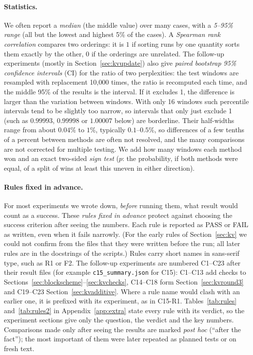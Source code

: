 \documentclass[10pt]{article}
\theoremstyle{plain}
\theoremstyle{definition}
\theoremstyle{remark}
\newcommand{\rl}[1]{\textsf{#1}}%
\begin{document}
\paragraph{Statistics.}
We often report a \emph{median} (the middle value) over many cases, with a \emph{5--95\% range} (all but the lowest and highest 5\% of the cases). A \emph{Spearman rank correlation} compares two orderings: it is $1$ if sorting runs by one quantity sorts them exactly by the other, $0$ if the orderings are unrelated. The follow-up experiments (mostly in Section~\ref{sec:kvupdate}) also give \emph{paired bootstrap 95\% confidence intervals} (CI) for the ratio of two perplexities: the test windows are resampled with replacement 10{,}000 times, the ratio is recomputed each time, and the middle 95\% of the results is the interval. If it excludes 1, the difference is larger than the variation between windows. With only 16 windows such percentile intervals tend to be slightly too narrow, so intervals that only just exclude 1 (such as $0.99993$, $0.99998$ or $1.00007$ below) are borderline. Their half-widths range from about $0.04\%$ to $1\%$, typically $0.1$--$0.5\%$, so differences of a few tenths of a percent between methods are often not resolved, and the many comparisons are not corrected for multiple testing. We add how many windows each method won and an exact two-sided \emph{sign test} ($p$: the probability, if both methods were equal, of a split of wins at least this uneven in either direction).

\paragraph{Rules fixed in advance.}
For most experiments we wrote down, \emph{before} running them, what result would count as a success. These \emph{rules fixed in advance} protect against choosing the success criterion after seeing the numbers. Each rule is reported as PASS or FAIL as written, even when it fails narrowly. (For the early rules of Section~\ref{sec:kv} we could not confirm from the files that they were written before the run; all later rules are in the docstrings of the scripts.) Rules carry short names in sans-serif type, such as \rl{R1} or \rl{F2}. The follow-up experiments are numbered C1--C23 after their result files (for example \texttt{c15\_summary.json} for C15): C1--C13 add checks to Sections~\ref{sec:blockscheme}--\ref{sec:kvchecks}, C14--C18 form Section~\ref{sec:kvround3} and C19--C23 Section~\ref{sec:kvadditive}. Where a rule name would clash with an earlier one, it is prefixed with its experiment, as in \rl{C15-R1}. Tables~\ref{tab:rules} and~\ref{tab:rules2} in Appendix~\ref{app:extra} state every rule with its verdict, so the experiment sections give only the question, the verdict and the key numbers. Comparisons made only after seeing the results are marked \emph{post hoc} (``after the fact''); the most important of them were later repeated as planned tests or on fresh text.
\end{document}
